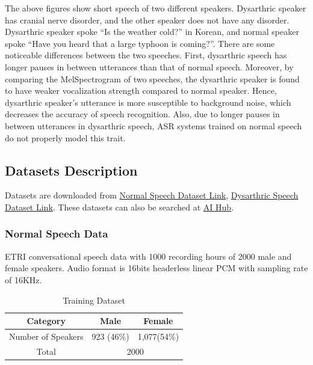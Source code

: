 \documentclass[9pt,final,a4paper]{IEEEtran}
\begin{document}
The above figures show short speech of two different speakers. Dysarthric speaker has cranial nerve disorder, and the other speaker does not have any disorder.
Dysarthric speaker spoke \enquote{Is the weather cold?} in Korean, and normal speaker spoke \enquote{Have you heard that a large typhoon is coming?}.
There are some noticeable differences between the two speeches. First, dysarthric speech has longer pauses in between utterances than that of normal speech.
Moreover, by comparing the MelSpectrogram of two speeches, the dysarthric speaker is found to have weaker vocalization strength compared to normal speaker.
Hence, dysarthric speaker's utterance is more susceptible to background noise, which decreases the accuracy of speech recognition.
Also, due to longer pauses in between utterances in dysarthric speech, ASR systems trained on normal speech do not properly model this trait\cite{cite2}.

\subsection{Datasets Description}

Datasets are downloaded from \href{https://aihub.or.kr/aihubdata/data/view.do?currMenu=115&topMenu=100&aihubDataSe=realm&dataSetSn=123}{Normal Speech Dataset Link}, \href{https://aihub.or.kr/aihubdata/data/view.do?currMenu=115&topMenu=100&aihubDataSe=realm&dataSetSn=608}{Dysarthric Speech Dataset Link}.
These datasets can also be searched at \href{https://aihub.or.kr/}{AI Hub}.

\subsubsection{Normal Speech Data}

ETRI conversational speech data with 1000 recording hours of 2000 male and female speakers.
Audio format is 16bits headerless linear PCM with sampling rate of 16KHz.

\begin{table}[h]
    \caption*{Training Dataset}
    \vspace*{-3mm}
    \begin{center}
        \begin{tabular}{|c|c|c|}
            \hline
            Category & Male & Female \\ [0.5ex] 
            \hline\hline
            Number of Speakers & 923 (46\%) & 1,077(54\%) \\ 
            \hline
            Total & \multicolumn{2}{|c|}{2000} \\
            \hline
        \end{tabular}
    \end{center}
\end{table}
\end{document}
